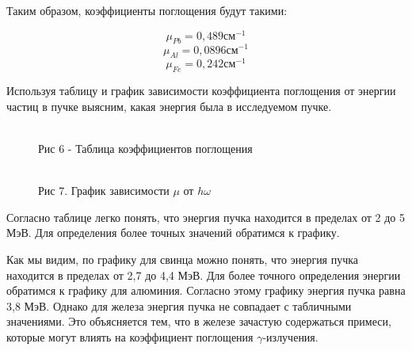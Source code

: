 \documentclass[12pt]{article}
\begin{document}
  Таким образом, коэффициенты поглощения будут такими:

  $$
    \mu_{Pb} = 0,489 см^{-1}
  $$
  $$
    \mu_{Al} = 0,0896 см^{-1}
  $$
  $$
    \mu_{Fe} = 0,242 см^{-1}
  $$

  Используя таблицу и график зависимости коэффициента поглощения от энергии
  частиц в пучке выясним, какая энергия была в исследуемом пучке.

  \begin {figure}[h!]
    \begin{minipage}[h]{0.49\linewidth}
      \\
      Рис 6 - Таблица коэффициентов поглощения
    \end{minipage}
    \hspace{0.5cm}
    \begin{minipage}[h]{0.49\linewidth}
      \\
      Рис 7. График зависимости $\mu$ от $h\omega$
    \end{minipage}
    \label {fig:tables}
  \end {figure}

  Согласно таблице легко понять, что энергия пучка находится в пределах от 2
  до 5 МэВ. Для определения более точных значений обратимся к графику.

  Как мы видим, по графику для свинца можно понять, что энергия пучка находится
  в пределах от 2,7 до 4,4 МэВ. Для более точного определения энергии обратимся
  к графику для алюминия. Согласно этому графику энергия пучка равна 3,8 МэВ.
  Однако для железа энергия пучка не совпадает с табличными значениями. Это
  объясняется тем, что в железе зачастую содержаться примеси, которые могут
  влиять на коэффициент поглощения $\gamma$-излучения.
\end{document}
